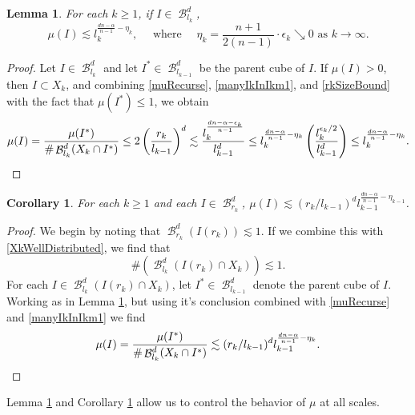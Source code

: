 \documentclass[dvipsnames,letterpaper,12pt]{article}
\numberwithin{equation}{section}
\theoremstyle{plain}
\newtheorem{lemma}{Lemma}
\newtheorem{corollary}{Corollary}
\theoremstyle{remark}
\DeclareMathOperator{\B}{\mathcal{B}}
\begin{document}
\begin{lemma}\label{massSomeScales}
	For each $k \geq 1$, if $I \in \B^d_{l_k}$,
	\[ \mu(I) \lesssim l_k^{\frac{dn-\alpha}{n-1}- \eta_k}, \quad \text{ where } \quad \eta_k = \frac{n+1}{2(n-1)} \cdot \epsilon_k \searrow 0 \text{ as } k \rightarrow \infty. \]
\end{lemma}
\begin{proof}
	Let $I \in \B^d_{l_k}$ and let $I^* \in \B^d_{l_{k-1}}$ be the parent cube of $I$. If $\mu(I) > 0$, then $I \subset X_k$, and combining \eqref{muRecurse}, \eqref{manyIkInIkm1}, and \eqref{rkSizeBound} with the fact that $\mu(I^*) \leq 1$, we obtain
	\[ \mu(I) = \frac{\mu(I^*)}{\# \B^d_{l_k}(X_k \cap I^*)} \leq 2 \left( \frac{r_k}{l_{k-1}} \right)^d \lesssim \frac{l_k^{\frac{dn - \alpha - \epsilon_k}{n-1}}}{l_{k-1}^d} \leq l_k^{\frac{dn - \alpha}{n-1} - \eta_k} \left( \frac{l_k^{\epsilon_k/2}}{l_{k-1}^d} \right) \leq l_k^{\frac{dn - \alpha}{n-1} - \eta_k}. \qedhere \]
\end{proof}

\begin{corollary}\label{muAtScaleRk}
	For each $k \geq 1$ and each $I \in \B^d_{r_k}$, $\mu(I) \lesssim (r_k/l_{k-1})^d l_{k-1}^{\frac{dn-\alpha}{n-1}-\eta_{k-1}}$.
\end{corollary}
\begin{proof}
	We begin by noting that $\B^d_{r_k}(I(r_k)) \lesssim 1$. If we combine this with \eqref{XkWellDistributed}, we find that
	\begin{equation} \label{oneBound}
		\#(\B^d_{l_k}(I(r_k) \cap X_k)) \lesssim 1.
	\end{equation}
	For each $I \in \B^d_{l_k}(I(r_k) \cap X_k)$, let $I^* \in \B^d_{l_{k-1}}$ denote the parent cube of $I$. Working as in Lemma \ref{massSomeScales}, but using it's conclusion combined with \eqref{muRecurse} and \eqref{manyIkInIkm1} we find
	\[ \mu(I) = \frac{\mu(I^*)}{\# \B_{l_k}^d(X_k \cap I^*)} \lesssim (r_k/l_{k-1})^d l_{k-1}^{\frac{dn - \alpha}{n-1} - \eta_k}. \qedhere \]
\end{proof}

Lemma \ref{massSomeScales} and Corollary \ref{muAtScaleRk} allow us to control the behavior of $\mu$ at all scales. 
\end{document}
